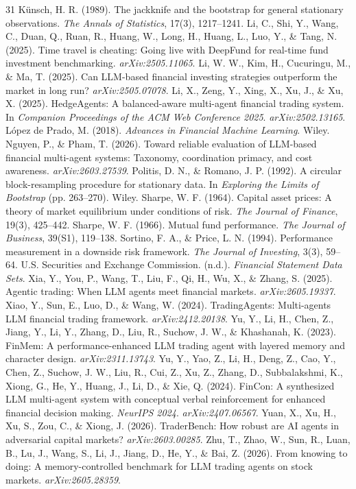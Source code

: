 \documentclass{article}
\begin{document}
\begin{thebibliography}{31}
 K\"{u}nsch, H. R. (1989). The jackknife and the bootstrap for general stationary observations. \textit{The Annals of Statistics}, 17(3), 1217--1241.
 Li, C., Shi, Y., Wang, C., Duan, Q., Ruan, R., Huang, W., Long, H., Huang, L., Luo, Y., \& Tang, N. (2025). Time travel is cheating: Going live with DeepFund for real-time fund investment benchmarking. \textit{arXiv:2505.11065}.
 Li, W. W., Kim, H., Cucuringu, M., \& Ma, T. (2025). Can LLM-based financial investing strategies outperform the market in long run? \textit{arXiv:2505.07078}.
 Li, X., Zeng, Y., Xing, X., Xu, J., \& Xu, X. (2025). HedgeAgents: A balanced-aware multi-agent financial trading system. In \textit{Companion Proceedings of the ACM Web Conference 2025}. \textit{arXiv:2502.13165}.
 L\'{o}pez de Prado, M. (2018). \textit{Advances in Financial Machine Learning}. Wiley.
 Nguyen, P., \& Pham, T. (2026). Toward reliable evaluation of LLM-based financial multi-agent systems: Taxonomy, coordination primacy, and cost awareness. \textit{arXiv:2603.27539}.
 Politis, D. N., \& Romano, J. P. (1992). A circular block-resampling procedure for stationary data. In \textit{Exploring the Limits of Bootstrap} (pp. 263--270). Wiley.
 Sharpe, W. F. (1964). Capital asset prices: A theory of market equilibrium under conditions of risk. \textit{The Journal of Finance}, 19(3), 425--442.
 Sharpe, W. F. (1966). Mutual fund performance. \textit{The Journal of Business}, 39(S1), 119--138.
 Sortino, F. A., \& Price, L. N. (1994). Performance measurement in a downside risk framework. \textit{The Journal of Investing}, 3(3), 59--64.
 U.S. Securities and Exchange Commission. (n.d.). \textit{Financial Statement Data Sets}.
 Xia, Y., You, P., Wang, T., Liu, F., Qi, H., Wu, X., \& Zhang, S. (2025). Agentic trading: When LLM agents meet financial markets. \textit{arXiv:2605.19337}.
 Xiao, Y., Sun, E., Luo, D., \& Wang, W. (2024). TradingAgents: Multi-agents LLM financial trading framework. \textit{arXiv:2412.20138}.
 Yu, Y., Li, H., Chen, Z., Jiang, Y., Li, Y., Zhang, D., Liu, R., Suchow, J. W., \& Khashanah, K. (2023). FinMem: A performance-enhanced LLM trading agent with layered memory and character design. \textit{arXiv:2311.13743}.
 Yu, Y., Yao, Z., Li, H., Deng, Z., Cao, Y., Chen, Z., Suchow, J. W., Liu, R., Cui, Z., Xu, Z., Zhang, D., Subbalakshmi, K., Xiong, G., He, Y., Huang, J., Li, D., \& Xie, Q. (2024). FinCon: A synthesized LLM multi-agent system with conceptual verbal reinforcement for enhanced financial decision making. \textit{NeurIPS 2024}. \textit{arXiv:2407.06567}.
 Yuan, X., Xu, H., Xu, S., Zou, C., \& Xiong, J. (2026). TraderBench: How robust are AI agents in adversarial capital markets? \textit{arXiv:2603.00285}.
 Zhu, T., Zhao, W., Sun, R., Luan, B., Lu, J., Wang, S., Li, J., Jiang, D., He, Y., \& Bai, Z. (2026). From knowing to doing: A memory-controlled benchmark for LLM trading agents on stock markets. \textit{arXiv:2605.28359}.
\end{thebibliography}
\end{document}
